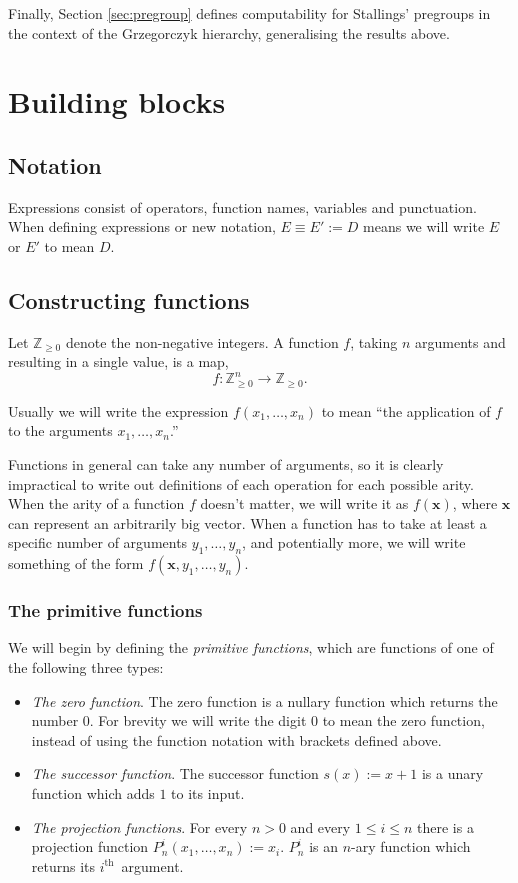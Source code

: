 \documentclass[a4paper]{article}
\newcommand{\Zpos}{\mathbb{Z}_{\geq 0}}
\newcommand{\ith}{$i^{\textrm{th}}$~}
\newcommand{\xvec}{\mathbf{x}}	%
\theoremstyle{plain}
\theoremstyle{definition}
\begin{document}
Finally, Section \ref{sec:pregroup} defines computability for Stallings' pregroups \cite{Stallings_1971} in the context of the Grzegorczyk hierarchy, generalising the results above.


\section{Building blocks \label{buildingblocks}}
 
\subsection{Notation}
Expressions consist of operators, function names, variables and punctuation. 
When defining expressions or new notation, $E \equiv E' := D$ means we will write $E$ or $E'$ to mean $D$.

\subsection{Constructing functions}
Let $\Zpos$ denote the non-negative integers. A function $f$, taking $n$ arguments and resulting in a single value, is a map,
\[f: \Zpos^n \rightarrow \Zpos.\]

Usually we will write the expression $f(x_1, \dots, x_n)$ to mean ``the application of $f$ to the arguments $x_1,\dots,x_n$.''

Functions in general can take any number of arguments, so it is clearly impractical to write out definitions of each operation for each possible arity. When the arity of a function $f$ doesn't matter, we will write it as $f(\xvec)$, where $\xvec$ can represent an arbitrarily big vector.  When a function has to take at least a specific number of arguments $y_1, \dots, y_n$, and potentially more, we will write something of the form $f(\xvec, y_1, \dots, y_n)$.

\subsubsection{The primitive functions}

We will begin by defining the {\it primitive functions}, which are functions of one of the following three types:

\begin{itemize}
	\item {\em The zero function}. The zero function  is a nullary function which returns the number $0$. For brevity we will write the digit $0$ to mean the zero function, instead of using the function notation with brackets defined above.
	\item {\em The successor function}. The successor function $s(x) := x + 1$ is a unary function which adds $1$ to its input.
	\item {\em The projection functions}. For every $n > 0 $ and every $1 \leq i \leq n$ there is a projection function $P_n^i(x_1, \dots, x_n) := x_i$. $P_n^i$ is an $n$-ary function which returns its \ith argument.
\end{itemize}
\end{document}
